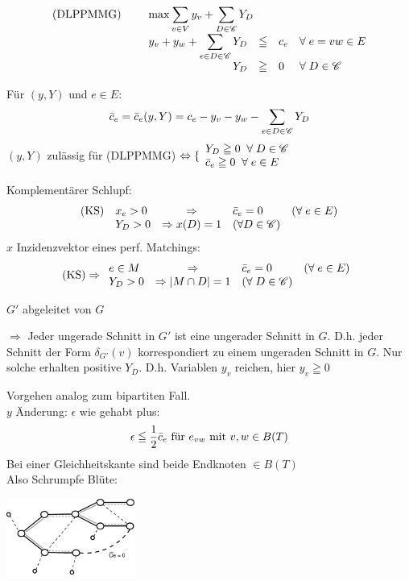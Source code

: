 \[\begin{array}{lrcll}
\mbox{(DLPPMMG)} \hspace{5mm}&\multicolumn{4}{l}{\max \displaystyle
\sum_{v\in V} y_v + \sum_{D \in \mathscr{C}} Y_D}\\
&y_v+y_w + \displaystyle \sum_{e\in D \in \mathscr{C}} Y_D
&\leqq&c_e&\forall \; e = v w \in E\\
&Y_D&\geqq&0&\forall \; D\in \mathscr{C}
\end{array}\]

Für $(y,Y)$ und $e \in E$:
\[\bar{c}_e = \bar{c}_e(y,Y) = c_e - y_v - y_w - \sum_{e \in D \in \mathscr{C}} Y_D\]
$(y,Y)$ zulässig für (DLPPMMG) $\Leftrightarrow \{ \begin{array}{l} Y_D \geqq
0 \; \; \forall \; D \in \mathscr{C}\\ \bar{c}_e \geqq 0 \; \; \forall \; e \in
E\end{array}$

Komplementärer Schlupf:
\[\begin{array}{llcll}
\mbox{(KS)}&x_e > 0 & \Rightarrow&\bar{c}_e = 0& (\forall \; e \in E)\\
&Y_D > 0&\Rightarrow x(D) = 1 & (\forall D \in \mathscr{C})
\end{array}
\]
$x$ Inzidenzvektor eines perf. Matchings:
\[
\mbox{(KS)} \Rightarrow \begin{array}{lcll} e \in M &\Rightarrow& \bar{c}_e =
0&(\forall \; e \in E)\\
Y_D >0 &\Rightarrow |M \cap D| =1&(\forall\; D \in \mathscr{C})
\end{array} 
\]



$G'$ abgeleitet von $G$

$\Rightarrow$ Jeder ungerade Schnitt in $G'$ ist eine ungerader Schnitt in
$G$. D.h. jeder Schnitt der Form $\delta_{G'}(v)$ korrespondiert zu einem
ungeraden Schnitt in $G$. Nur solche erhalten positive $Y_D$. D.h.
Variablen $y_v$ reichen, hier $y_v \geqq 0$

Vorgehen analog zum bipartiten Fall.\\
$y$ Änderung: $\epsilon$ wie gehabt plus:
\[\epsilon \leqq \frac{1}{2} \bar{c}_e \mbox{ für } e_{vw} \mbox{ mit }v,w \in
B(T)\]
Bei einer Gleichheitskante sind beide Endknoten $\in B(T)$\\
Also Schrumpfe Blüte:

\includegraphics[height=2.5cm]{bilder/5-3SchrumpfAllg}

